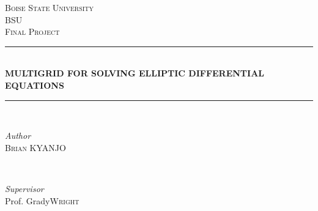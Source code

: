 \documentclass[12pt,a4paper]{article}
\begin{document}
	
	
	\begin{titlepage} %
		
		\newcommand{\HRule}{\rule{\linewidth}{0.5mm}} %
		
		\center %
		
		
		\textsc{\LARGE Boise State University}\\[1.5cm] %
		
		\textsc{\Large BSU}\\[0.5cm] %
		
		\textsc{\large Final Project}\\[0.5cm] %
		
		
		\HRule\\[0.4cm]
		
		{\huge\bfseries MULTIGRID FOR SOLVING ELLIPTIC DIFFERENTIAL EQUATIONS}\\[0.4cm] %
		
		\HRule\\[1.5cm]
		
		
		\begin{minipage}{0.4\textwidth}
			\begin{flushleft}
				\large
				\textit{Author}\\
				 \textsc{Brian KYANJO} %
			\end{flushleft}
		\end{minipage}
		~
		\begin{minipage}{0.4\textwidth}
			\begin{flushright}
				\large
				\textit{Supervisor}\\
				Prof. Grady\textsc{Wright} %
			\end{flushright}
		\end{minipage}
		

\end{titlepage}
\end{document}
